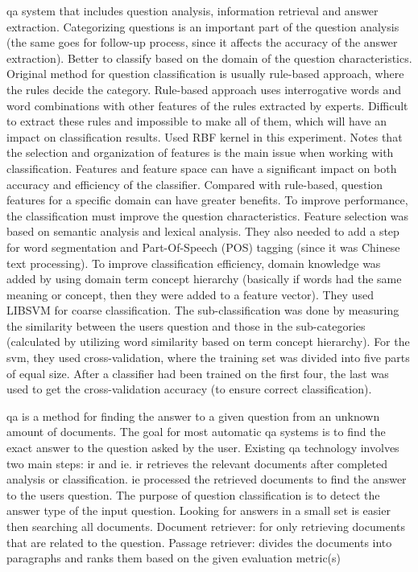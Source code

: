 \gls{qa} system that includes question analysis, information retrieval and answer extraction.
Categorizing questions is an important part of the question analysis (the same goes for follow-up process, since it affects the accuracy of the answer extraction).
Better to classify based on the domain of the question characteristics. 
Original method for question classification is usually rule-based approach, where the rules decide the category. 
Rule-based approach uses interrogative words and word combinations with other features of the rules extracted by experts. 
Difficult to extract these rules and impossible to make all of them, which will have an impact on classification results. 
Used RBF kernel in this experiment. 
Notes that the selection and organization of features is the main issue when working with classification. 
Features and feature space can have a significant impact on both accuracy and efficiency of the classifier. 
Compared with rule-based, question features for a specific domain can have greater benefits. 
To improve performance, the classification must improve the question characteristics. 
Feature selection was based on semantic analysis and lexical analysis. 
They also needed to add a step for word segmentation and Part-Of-Speech (POS) tagging (since it was Chinese text processing). 
To improve classification efficiency, domain knowledge was added by using domain term concept hierarchy (basically if words had the same meaning or concept, then they were added to a feature vector). 
They used LIBSVM for coarse classification. 
The sub-classification was done by measuring the similarity between the users question and those in the sub-categories  (calculated by utilizing word similarity based on term concept hierarchy). 
For the \gls{svm}, they used cross-validation, where the training set was divided into five parts of equal size. 
After a classifier had been trained on the first four, the last was used to get the cross-validation accuracy (to ensure correct classification).
\cite{Xu2012}


\gls{qa} is a method for finding the answer to a given question from an unknown amount of documents. 
The goal for most automatic \gls{qa} systems is to find the exact answer to the question asked by the user. 
Existing \gls{qa} technology involves two main steps: \gls{ir} and \gls{ie}.
\gls{ir} retrieves the  relevant documents after completed analysis or classification.
\gls{ie} processed the retrieved documents to find the answer to the users question.
The purpose of question classification is to detect the answer type of the input question. 
Looking for answers in a small set is easier then searching all documents. 
Document retriever: for only retrieving documents that are related to the question.
Passage retriever: divides the documents into paragraphs and ranks them based on the given evaluation metric(s)
\cite{Yen2013}


